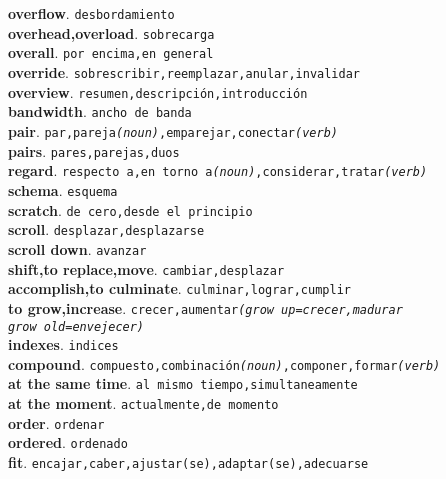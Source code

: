 \documentclass[twocolumn]{article}
\begin{document}
	\textsf{\textbf{overflow}}. \texttt{desbordamiento}\\
	\textsf{\textbf{overhead,overload}}. \texttt{sobrecarga}\\
	\textsf{\textbf{overall}}. \texttt{por encima,en general}\\
	\textsf{\textbf{override}}. \texttt{sobrescribir,reemplazar,anular,invalidar}\\
	\textsf{\textbf{overview}}. \texttt{resumen,descripci\'on,introducci\'on}\\
	\textsf{\textbf{bandwidth}}. \texttt{ancho de banda}\\
	\textsf{\textbf{pair}}. \texttt{par,pareja{\scriptsize \textsl{(noun)}},emparejar,conectar{\scriptsize \textsl{(verb)}}}\\
	\textsf{\textbf{pairs}}. \texttt{pares,parejas,duos}\\
	\textsf{\textbf{regard}}. \texttt{respecto a,en torno a{\scriptsize \textsl{(noun)}},considerar,tratar{\scriptsize \textsl{(verb)}}}\\
	\textsf{\textbf{schema}}. \texttt{esquema}\\
	\textsf{\textbf{scratch}}. \texttt{de cero,desde el principio}\\
	\textsf{\textbf{scroll}}. \texttt{desplazar,desplazarse}\\
	\textsf{\textbf{scroll down}}. \texttt{avanzar}\\
	\textsf{\textbf{shift,to replace,move}}. \texttt{cambiar,desplazar}\\
	\textsf{\textbf{accomplish,to culminate}}. \texttt{culminar,lograr,cumplir}\\
	\textsf{\textbf{to grow,increase}}. \texttt{crecer,aumentar{\scriptsize \textsl{(grow up=crecer,madurar\\grow old=envejecer)}}}\\
	\textsf{\textbf{indexes}}. \texttt{indices}\\
	\textsf{\textbf{compound}}. \texttt{compuesto,combinaci\'on{\scriptsize \textsl{(noun)}},componer,formar{\scriptsize \textsl{(verb)}}}\\
	\textsf{\textbf{at the same time}}. \texttt{al mismo tiempo,simultaneamente}\\
	\textsf{\textbf{at the moment}}. \texttt{actualmente,de momento}\\
	\textsf{\textbf{order}}. \texttt{ordenar}\\
	\textsf{\textbf{ordered}}. \texttt{ordenado}\\
	\textsf{\textbf{fit}}. \texttt{encajar,caber,ajustar(se),adaptar(se),adecuarse}\\
\end{document}
